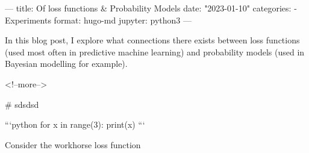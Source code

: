 ---
title: Of loss functions & Probability Models
date: "2023-01-10"
categories: 
  - Experiments
format: hugo-md
jupyter: python3
---

In this blog post, I explore what connections there exists between loss functions (used most often in predictive machine learning)
and probability models (used in Bayesian modelling for example).

<!--more-->


# sdsdsd 

```{python}
for x in range(3):
  print(x)
```

Consider the workhorse loss function

